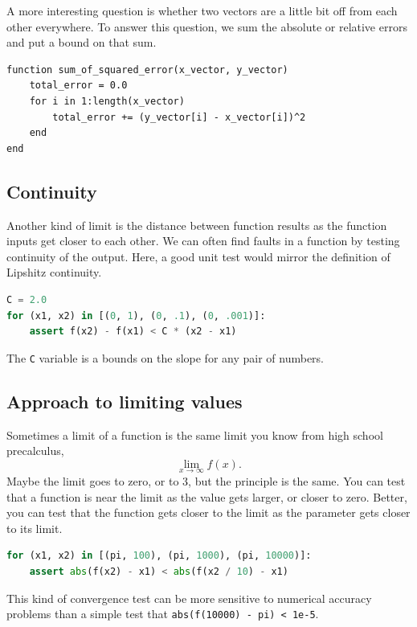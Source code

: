 \documentclass[fleqn,10pt]{olplainarticle}
\begin{document}
A more interesting question is whether two vectors are a little
bit off from each other everywhere. To answer this question,
we sum the absolute or relative errors and put a bound on that
sum.
\begin{lstlisting}
function sum_of_squared_error(x_vector, y_vector)
    total_error = 0.0
    for i in 1:length(x_vector)
    	total_error += (y_vector[i] - x_vector[i])^2
    end
end
\end{lstlisting}


\subsection{Continuity}

Another kind of limit is the distance between function results
as the function inputs get closer to each other. We can often
find faults in a function by testing continuity of the output.
Here, a good unit test would mirror the definition of Lipshitz continuity.
\begin{lstlisting}[language=python]
C = 2.0
for (x1, x2) in [(0, 1), (0, .1), (0, .001)]:
    assert f(x2) - f(x1) < C * (x2 - x1)
\end{lstlisting}
The \lstinline!C! variable is a bounds on the slope for any
pair of numbers.

\subsection{Approach to limiting values}

Sometimes a limit of a function is the same limit you know
from high school precalculus,
\begin{equation}
  \lim_{x\rightarrow\infty} f(x).
\end{equation}
Maybe the limit goes to zero, or to 3, but the principle is
the same. You can test that a function is near the limit
as the value gets larger, or closer to zero. Better, you can
test that the function gets closer to the limit as the
parameter gets closer to its limit.
\begin{lstlisting}[language=python]
for (x1, x2) in [(pi, 100), (pi, 1000), (pi, 10000)]:
    assert abs(f(x2) - x1) < abs(f(x2 / 10) - x1)
\end{lstlisting}
This kind of convergence test can be more sensitive to
numerical accuracy problems than a simple test
that \lstinline|abs(f(10000) - pi) < 1e-5|.
\end{document}
